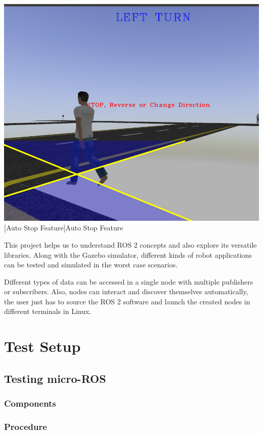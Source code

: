 \documentclass[%
xelatex,
	oneside,		%
	12pt,			%
	parskip=half,	%
	abstracton,
	chapterprefix=true%
    appendixprefix=true]
{scrbook}
\begin{document}
			\begin{center}
\includegraphics[scale=0.3]{fig/final2adas.png}
[Auto Stop Feature]{Auto Stop Feature}
\label{fig:lane1}
\end{center}
This project helps us to understand ROS 2 concepts and also explore its versatile libraries. Along with the Gazebo simulator, different kinds of robot applications can be tested and simulated in the worst case scenarios. 

Different types of data can be accessed in a single node with multiple publishers or subscribers. Also, nodes can interact and discover themselves automatically, the user just has to source the ROS 2 software and launch the created nodes in different terminals in Linux.
	\chapter{Test Setup}
		
\rofoot[\pagemark]{\pagemark}

	\section{Testing micro-ROS}

	\subsection{Components}
	\subsection{Procedure}	
\end{document}
